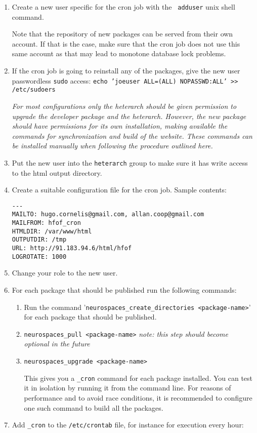\documentclass[12pt]{article}
\begin{document}
\begin{enumerate}
\item Create a new user specific for the cron job with the {\tt
    adduser} unix shell command.

  Note that the repository of new packages can be served from their
  own account.  If that is the case, make sure that the cron job does
  not use this same account as that may lead to monotone database lock
  problems.

\item If the cron job is going to reinstall any of the packages, give
  the new user passwordless {\tt sudo} access: {\tt echo 'joeuser
    ALL=(ALL) NOPASSWD:ALL' >> /etc/sudoers}

  {\it For most configurations only the heterarch should be given
    permission to upgrade the developer package and the heterarch.
    However, the new package should have permissions for its own
    installation, making available the commands for synchronization
    and build of the website.  These commands can be installed
    manually when following the procedure outlined here.}

\item Put the new user into the {\tt heterarch} group to make sure it
  has write access to the html output directory.
\item Create a suitable configuration file for the cron job.  Sample
  contents:
\begin{verbatim}
---
MAILTO: hugo.cornelis@gmail.com, allan.coop@gmail.com
MAILFROM: hfof_cron
HTMLDIR: /var/www/html
OUTPUTDIR: /tmp
URL: http://91.183.94.6/html/hfof
LOGROTATE: 1000
\end{verbatim}
\item Change your role to the new user.
\item For each package that should be published run the following
  commands:
  \begin{enumerate}
  \item Run the command '{\tt neurospaces\_create\_directories
      <package-name>}' for each package that should be published.
  \item {\tt neurospaces\_pull <package-name>} {\it note: this step should
      become optional in the future}
  \item {\tt neurospaces\_upgrade <package-name>}

    This gives you a {\tt <package-name>\_cron} command for each
    package installed.  You can test it in isolation by running it
    from the command line.  For reasons of performance and to avoid
    race conditions, it is recommended to configure one such command
    to build all the packages.
  \end{enumerate}
\item Add {\tt <package-name>\_cron} to the {\tt /etc/crontab} file, for
  instance for execution every hour:


\end{enumerate}
\end{document}
